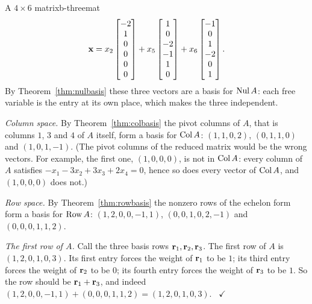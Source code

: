 \documentclass[11pt]{article}
\begin{document}
\begin{exmp}{A $4\times6$ matrix}{b-threemat}
\[
\mathbf{x}=x_2\begin{bmatrix}-2\\1\\0\\0\\0\\0\end{bmatrix}+x_5\begin{bmatrix}1\\0\\-2\\-1\\1\\0\end{bmatrix}+x_6\begin{bmatrix}-1\\0\\1\\-2\\0\\1\end{bmatrix}.
\]
By Theorem~\ref{thm:nulbasis} these three vectors are a basis for $\operatorname{Nul} A$: each free variable is the entry at its own place, which makes the three independent.

\emph{Column space.} By Theorem~\ref{thm:colbasis} the pivot columns of $A$, that is columns $1$, $3$ and $4$ of $A$ itself, form a basis for $\operatorname{Col} A$: $(1,1,0,2)$, $(0,1,1,0)$ and $(1,0,1,-1)$. (The pivot columns of the reduced matrix would be the wrong vectors. For example, the first one, $(1,0,0,0)$, is not in $\operatorname{Col} A$: every column of $A$ satisfies $-x_1-3x_2+3x_3+2x_4=0$, hence so does every vector of $\operatorname{Col} A$, and $(1,0,0,0)$ does not.)

\emph{Row space.} By Theorem~\ref{thm:rowbasis} the nonzero rows of the echelon form form a basis for $\operatorname{Row} A$: $(1,2,0,0,-1,1)$, $(0,0,1,0,2,-1)$ and $(0,0,0,1,1,2)$.

\emph{The first row of $A$.} Call the three basis rows $\mathbf{r}_1,\mathbf{r}_2,\mathbf{r}_3$. The first row of $A$ is $(1,2,0,1,0,3)$. Its first entry forces the weight of $\mathbf{r}_1$ to be $1$; its third entry forces the weight of $\mathbf{r}_2$ to be $0$; its fourth entry forces the weight of $\mathbf{r}_3$ to be $1$. So the row should be $\mathbf{r}_1+\mathbf{r}_3$, and indeed $(1,2,0,0,-1,1)+(0,0,0,1,1,2)=(1,2,0,1,0,3)$. \ $\checkmark$
\end{exmp}
\end{document}

